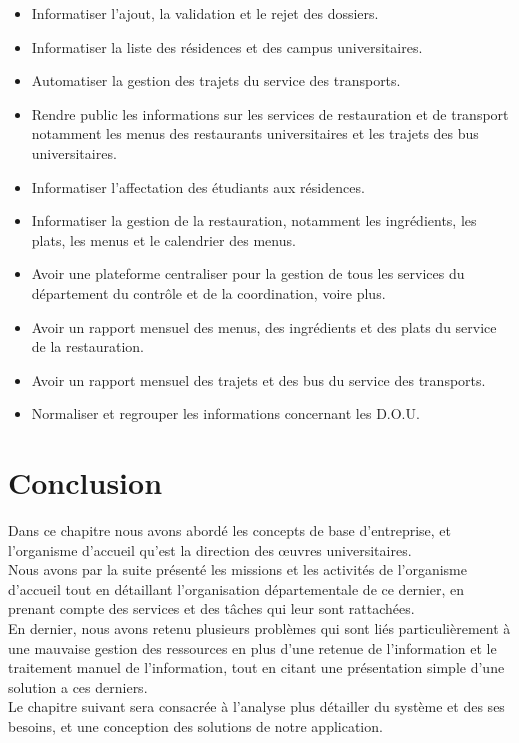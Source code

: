 \begin{itemize}
    \item Informatiser l'ajout, la validation et le rejet des dossiers.
    \item Informatiser la liste des résidences et des campus universitaires.
    \item Automatiser la gestion des trajets du service des transports.
    \item Rendre public les informations sur les services de restauration et de transport notamment les menus des restaurants universitaires et les trajets des bus universitaires. 
    \item Informatiser l'affectation des étudiants aux résidences.
    \item Informatiser la gestion de la restauration, notamment les ingrédients, les plats, les menus et le calendrier des menus.
    \item Avoir une plateforme centraliser pour la gestion de tous les services du département du contrôle et de la coordination, voire plus.
    \item Avoir un rapport mensuel des menus, des ingrédients et des plats du service de la restauration.
    \item Avoir un rapport mensuel des trajets et des bus du service des transports.
    \item Normaliser et regrouper les informations concernant les \acs{D.O.U}.\\
\end{itemize}

\section{Conclusion}
Dans ce chapitre nous avons abordé les concepts de base d'entreprise, et l'organisme d'accueil qu'est la direction des œuvres universitaires.\\

Nous avons par la suite présenté les missions et les activités de l'organisme d'accueil tout en détaillant l'organisation départementale de ce dernier, en prenant compte des services et des tâches qui leur sont rattachées.\\

En dernier, nous avons retenu plusieurs problèmes qui sont liés particulièrement à une mauvaise gestion des ressources en plus d’une retenue de l’information et le traitement manuel de l'information, tout en citant une présentation simple d'une solution a ces derniers.\\

Le chapitre suivant sera consacrée à l'analyse plus détailler du système et des ses besoins, et une conception des solutions de notre application.